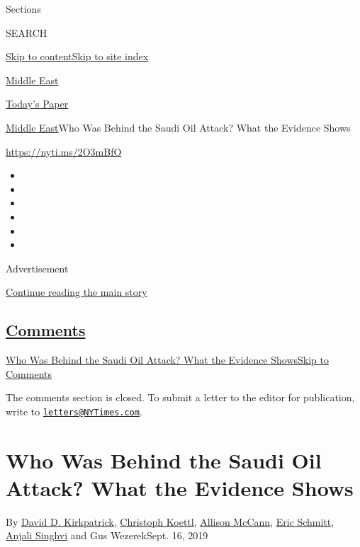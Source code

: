 Sections

SEARCH

\protect\hyperlink{site-content}{Skip to
content}\protect\hyperlink{site-index}{Skip to site index}

\href{https://www.nytimes3xbfgragh.onion/section/world/middleeast}{Middle
East}

\href{https://myaccount.nytimes3xbfgragh.onion/auth/login?response_type=cookie\&client_id=vi}{}

\href{https://www.nytimes3xbfgragh.onion/section/todayspaper}{Today's
Paper}

\href{/section/world/middleeast}{Middle East}\textbar{}Who Was Behind
the Saudi Oil Attack? What the Evidence Shows

\url{https://nyti.ms/2O3mBfO}

\begin{itemize}
\item
\item
\item
\item
\item
\item
\end{itemize}

Advertisement

\protect\hyperlink{after-top}{Continue reading the main story}

\hypertarget{comments}{%
\subsection{\texorpdfstring{\protect\hyperlink{commentsContainer}{Comments}}{Comments}}\label{comments}}

\href{}{Who Was Behind the Saudi Oil Attack? What the Evidence
Shows}\href{}{Skip to Comments}

The comments section is closed. To submit a letter to the editor for
publication, write to
\href{mailto:letters@NYTimes.com}{\nolinkurl{letters@NYTimes.com}}.

\hypertarget{who-was-behind-the-saudi-oil-attack-what-the-evidence-shows}{%
\section{Who Was Behind the Saudi Oil Attack? What the Evidence
Shows}\label{who-was-behind-the-saudi-oil-attack-what-the-evidence-shows}}

By
\href{https://www.nytimes3xbfgragh.onion/by/david-d-kirkpatrick}{David
D. Kirkpatrick},
\href{https://www.nytimes3xbfgragh.onion/by/christoph-koettl}{Christoph
Koettl},
\href{https://www.nytimes3xbfgragh.onion/by/allison-mccann}{Allison
McCann}, \href{https://www.nytimes3xbfgragh.onion/by/eric-schmitt}{Eric
Schmitt},
\href{https://www.nytimes3xbfgragh.onion/by/anjali-singhvi}{Anjali
Singhvi} and Gus WezerekSept. 16, 2019

